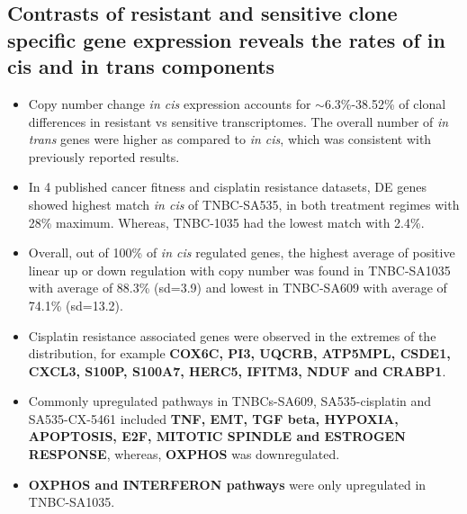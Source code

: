 \subsection{Contrasts of resistant and sensitive clone specific gene 
expression reveals the rates of in cis and in trans components} 
\begin{itemize}
   
   \item Copy number change \textit{in cis} expression accounts for $\sim${6.3\%-38.52\%} of clonal differences in resistant vs sensitive transcriptomes. The overall number of \textit{in trans} genes were higher as compared to \textit{in cis}, which was consistent with previously reported results.
 
 
 
 
 
 \item  In 4 published cancer fitness and cisplatin resistance datasets, DE genes showed  highest match \textit{in cis} of TNBC-SA535, in both treatment regimes with 28\% maximum. Whereas, TNBC-1035 had the lowest match with 2.4\%.

 \item Overall, out of 100\% of \textit{in cis} regulated genes, the highest average of positive linear up or down regulation with copy number was found in TNBC-SA1035 with average of 88.3\% (sd=3.9) and lowest in TNBC-SA609 with average of 74.1\% (sd=13.2). 
 
 \item Cisplatin resistance associated genes were observed in the extremes of the distribution, for example \textbf{COX6C, PI3, UQCRB, ATP5MPL, CSDE1, CXCL3, S100P, S100A7, HERC5, IFITM3, NDUF and  CRABP1}.
 
  \item Commonly upregulated pathways in TNBCs-SA609, SA535-cisplatin and SA535-CX-5461 included \textbf{TNF, EMT, TGF beta, HYPOXIA, APOPTOSIS, E2F, MITOTIC SPINDLE and ESTROGEN  RESPONSE}, whereas, \textbf{OXPHOS} was downregulated. 
 
 \item \textbf{OXPHOS and INTERFERON pathways} were only upregulated  in TNBC-SA1035.

\end{itemize}

